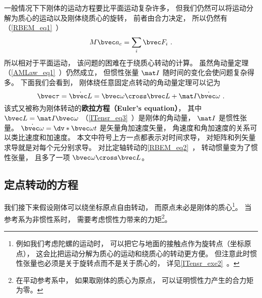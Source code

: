 

一般情况下下刚体的运动方程要比平面运动复杂许多， 但我们仍然可以将运动分解为质心的运动以及刚体绕质心的旋转， 前者由合力决定， 所以仍然有（\autoref{RBEM_eq1}~）
\begin{equation}\label{RBEqM_eq8}
M\bvec a_c = \sum_i \bvec F_i~.
\end{equation}
所以相对于平面运动， 该问题的困难在于绕质心转动的计算。 虽然角动量定理（\autoref{AMLaw_eq1}~）仍然成立， 但惯性张量 $\mat I$ 随时间的变化会使问题复杂得多。 下面我们会看到， 刚体绕任意固定点转动的角动量定理可以记为
\begin{equation}\label{RBEqM_eq1}
\bvec\tau = \dot{\bvec L} = \bvec\omega \cross \bvec L + \mat I \dot{\bvec\omega}~.
\end{equation}
该式又被称为刚体转动的\textbf{欧拉方程（Euler's equation）}， 其中 $\bvec L = \mat I\bvec\omega$ （\autoref{ITensr_eq3}~）是刚体的角动量， $\mat I$ 是惯性张量。 $\dot{\bvec\omega} = \dv*{\bvec\omega}{t}$ 是矢量角加速度矢量， 角速度和角加速度的关系可以类比速度和加速度。 本文中符号上方一点都表示对时间求导， 对矩阵和列矢量求导就是对每个元分别求导。  对比定轴转动的\autoref{RBEM_eq2}~， 转动惯量变为了惯性张量， 且多了一项 $\bvec\omega \cross \bvec L$。

\subsection{定点转动的方程}
我们接下来假设刚体可以绕坐标原点自由转动， 而原点未必是刚体的质心\footnote{例如我们考虑陀螺的运动时， 可以把它与地面的接触点作为旋转点（坐标原点）， 这会比把运动分解为质心的运动和绕质心的转动更方便。 但注意此时惯性张量也必须是关于旋转点而不是关于质心的， 详见\autoref{ITensr_exe2}~。}。 当参考系为非惯性系时， 需要考虑惯性力带来的力矩\footnote{在平动参考系中， 如果取刚体的质心为原点， 可以证明惯性力产生的合力矩为零。}。

